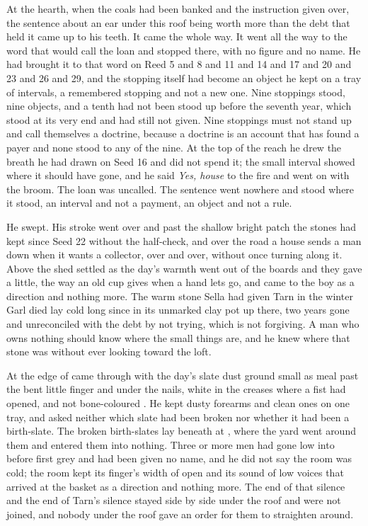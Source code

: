 At the hearth, when the coals had been banked and the instruction given over, the sentence about an ear under this roof being worth more than the debt that held it came up to his teeth. It came the whole way. It went all the way to the word that would call the loan and stopped there, with no figure and no name. He had brought it to that word on Reed 5 and 8 and 11 and 14 and 17 and 20 and 23 and 26 and 29, and the stopping itself had become an object he kept on a tray of intervals, a remembered stopping and not a new one. Nine stoppings stood, nine objects, and a tenth had not been stood up before the seventh year, which stood at its very end and had still not given. Nine stoppings must not stand up and call themselves a doctrine, because a doctrine is an account that has found a payer and none stood to any of the nine. At the top of the reach he drew the breath he had drawn on Seed 16 and did not spend it; the small interval showed where it should have gone, and he said \emph{Yes, house} to the fire and went on with the broom. The loan was uncalled. The sentence went nowhere and stood where it stood, an interval and not a payment, an object and not a rule.

He swept. His stroke went over  and past the shallow bright patch the stones had kept since Seed 22 without the half-check, and over the road a house sends a man down when it wants a collector, over and over, without once turning along it. Above the shed  settled as the day's warmth went out of the boards and they gave a little, the way an old cup gives when a hand lets go, and came to the boy as a direction and nothing more. The warm stone Sella had given Tarn in the winter Garl died lay cold long since in its unmarked clay pot up there, two years gone and unreconciled with the debt by not trying, which is not forgiving. A man who owns nothing should know where the small things are, and he knew where that stone was without ever looking toward the loft.

At the edge of   came through with the day's slate dust ground small as meal past the bent little finger and under the nails, white in the creases where a fist had opened, and not bone-coloured . He kept dusty forearms and clean ones on one tray, and asked neither which slate had been broken nor whether it had been a birth-slate. The broken birth-slates lay beneath  at , where the yard went around them and entered them into nothing. Three or more men had gone low into  before first grey and had been given no name, and he did not say the room was cold; the room kept its finger's width of open and its sound of low voices that arrived at the basket as a direction and nothing more. The end of that silence and the end of Tarn's silence stayed side by side under the roof and were not joined, and nobody under the roof gave an order for them to straighten around.

